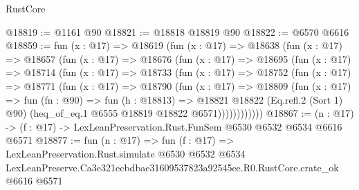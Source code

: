 \begin{lexlean}{RustCore}
\begin{coremodule}
@18819 := @1161 @90
@18821 := @18818 @18819 @90
@18822 := @6570 @6616
@18859 := fun (x : @17) =>
  @18619
    (fun (x : @17) =>
    @18638
      (fun (x : @17) =>
      @18657
        (fun (x : @17) =>
        @18676
          (fun (x : @17) =>
          @18695
            (fun (x : @17) =>
            @18714
              (fun (x : @17) =>
              @18733
                (fun (x : @17) =>
                @18752
                  (fun (x : @17) =>
                  @18771
                    (fun (x : @17) =>
                    @18790
                      (fun (x : @17) =>
                      @18809
                        (fun (x : @17) =>
                        fun (fn : @90) =>
                        fun (h : @18813) =>
                        @18821
                          @18822
                          (Eq.refl.{2} (Sort 1) @90)
                          (heq_of_eq.{1} @6555 @18819 @18822 @6571))))))))))))
@18867 := (n : @17) -> (f : @17) -> LexLeanPreservation.Rust.FunSem @6530 @6532 @6534 @6616 @6571
@18877 := fun (n : @17) =>
  fun (f : @17) =>
  LexLeanPreservation.Rust.simulate
    @6530
    @6532
    @6534
    LexLeanPreserve.Ca3e321ecbdbae31609537823a92545ee.R0.RustCore.crate_ok
    @6616
    @6571
\end{coremodule}
\end{lexlean}
